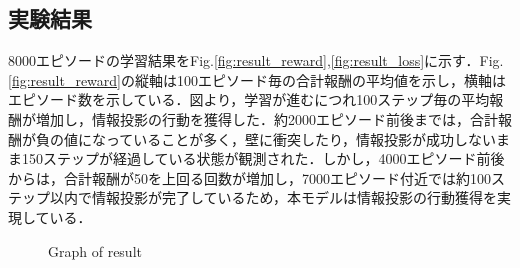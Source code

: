 \documentclass[12pt]{sonota/aislab}
\begin{document}
\subsection{実験結果}
8000エピソードの学習結果をFig.\ref{fig:result_reward},\ref{fig:result_loss}に示す．Fig.\ref{fig:result_reward}の縦軸は100エピソード毎の合計報酬の平均値を示し，横軸はエピソード数を示している．図より，学習が進むにつれ100ステップ毎の平均報酬が増加し，情報投影の行動を獲得した．約2000エピソード前後までは，合計報酬が負の値になっていることが多く，壁に衝突したり，情報投影が成功しないまま150ステップが経過している状態が観測された．しかし，4000エピソード前後からは，合計報酬が50を上回る回数が増加し，7000エピソード付近では約100ステップ以内で情報投影が完了しているため，本モデルは情報投影の行動獲得を実現している．

\begin{figure}[tbp]
	\begin{center}
	\end{center}
	\caption{Graph of result}
	\label{fig:result_graph}
\end{figure}
\end{document}

